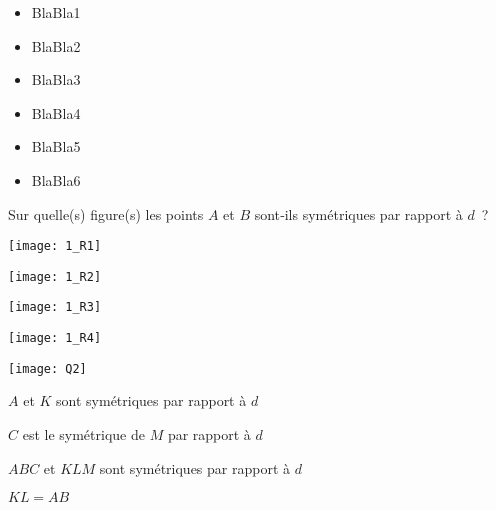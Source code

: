 \begin{acquis}
\begin{itemize}
\item BlaBla1
\item BlaBla2
\item BlaBla3
\item BlaBla4
\item BlaBla5
\item BlaBla6
\end{itemize}
\end{acquis}


\begin{QCM}
  \begin{GroupeQCM}
    \begin{exercice}
      Sur quelle(s) figure(s) les points $A$ et $B$ sont‑ils symétriques par rapport à $d$ ?
      \begin{ChoixQCM}{4}
      \item 
      
      \texttt{[image: 1\_R1]}
      \item 
      
      \texttt{[image: 1\_R2]}
      \item 
      
      \texttt{[image: 1\_R3]}
      \item 
      
      \texttt{[image: 1\_R4]}
      \end{ChoixQCM}
\begin{corrige}
   \end{corrige}
    \end{exercice}
    
    
    \begin{exercice}
      \begin{center} \texttt{[image: Q2]} \end{center}
      \begin{ChoixQCM}{4}
      \item $A$ et $K$ sont symétriques par rapport à $d$
      \item $C$ est le symétrique de $M$ par rapport à $d$
      \item $ABC$ et $KLM$ sont symétriques par rapport à $d$
      \item $KL = AB$
      \end{ChoixQCM}
\begin{corrige}
   \end{corrige}
    \end{exercice}
    

\end{GroupeQCM}
\end{QCM}
